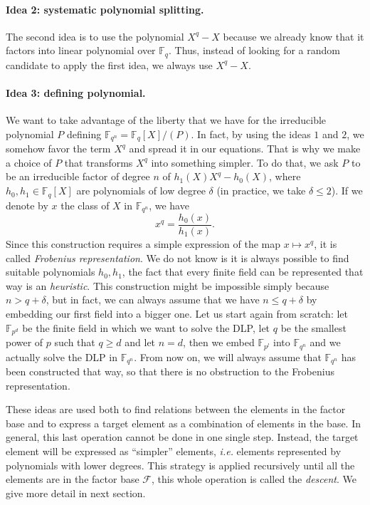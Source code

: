 \documentclass[a4paper,11pt]{article}
\theoremstyle{break}
\theoremstyle{sc}
\theoremstyle{definition}
\theoremstyle{remark}
\newcommand{\ie}{\emph{i.e. }}
\begin{document}
\paragraph{Idea 2: systematic polynomial splitting.} The second idea is to use
the polynomial $X^q-X$ because we already know that it factors into linear
polynomial over $\mathbb{F}_q$. Thus, instead of looking for a random candidate to
apply the first idea, we always use $X^q-X$.

\paragraph{Idea 3: defining polynomial.} We want to take advantage of the liberty that we
have for the irreducible polynomial $P$ defining
$\mathbb{F}_{q^{n}}=\mathbb{F}_{q}[X]/(P)$. In fact, by using the ideas $1$ and
$2$, we somehow favor the term $X^q$ and spread it in our equations. That is why
we make a choice of $P$ that transforms $X^q$ into something simpler. To do
that, we ask $P$ to be an irreducible factor of degree $n$ of
$h_1(X)X^q-h_0(X)$,
where $h_0, h_1\in\mathbb{F}_{q}[X]$ are polynomials of low degree $\delta$
(in practice, we take $\delta\leq2$). If we
denote by $x$ the class of $X$ in $\mathbb{F}_{q^{n}}$, we have
\[
  x^q=\frac{h_0(x)}{h_1(x)}.
\]
Since this construction requires a simple expression of the map $x\mapsto x^q$, it
is called \emph{Frobenius representation}. We do not know is it is always
possible to find suitable polynomials $h_0, h_1$, the fact that every finite
field can be represented that way is an \emph{heuristic}. This construction
might be impossible simply because $n > q+\delta$, but in fact, we can always
assume that we have $n\leq q+\delta$ by embedding our first field into a bigger
one. Let us start again from scratch: let $\mathbb{F}_{p^d}$ be the finite field
in which we want to solve the DLP, let $q$ be the smallest power of $p$ such
that $q\geq d$ and let $n=d$, then we embed $\mathbb{F}_{p^l}$ into
$\mathbb{F}_{q^n}$ and we actually solve the DLP in $\mathbb{F}_{q^n}$. From now
on, we will always assume that $\mathbb{F}_{q^n}$ has been constructed that way,
so that there is no obstruction to the Frobenius representation.

These ideas are used both to find relations between the elements in the factor
base and to express a target element as a combination of elements in the base.
In general, this last operation cannot be done in one single step. Instead, the
target element will be expressed as ``simpler'' elements, \ie elements
represented by polynomials with lower degrees. This strategy is applied
recursively until all the elements are in the factor base $\mathcal F$, this
whole operation is called the \emph{descent}. We give more detail in next
section.
\end{document}
